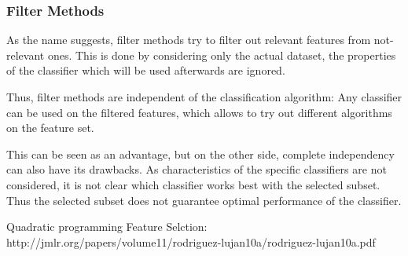 \subsubsection{Filter Methods}
\label{sec:methods.flat.filter}


As the name suggests, filter methods try to filter out relevant features from
not-relevant ones. 
This is done by considering only the actual dataset, 
the properties of the classifier which will be used afterwards are ignored.
 
Thus, filter methods are independent of the classification algorithm: Any
classifier can be used on the filtered features, 
which allows to try out different algorithms on the feature set.
 
This can be seen as an advantage, but on the other side, 
complete independency can also have its drawbacks. 
As characteristics of the specific classifiers are not considered, 
it is not clear which classifier works best with the selected subset. 
Thus the selected subset does not guarantee optimal performance of the classifier.

Quadratic programming Feature Selction:
http://jmlr.org/papers/volume11/rodriguez-lujan10a/rodriguez-lujan10a.pdf 




